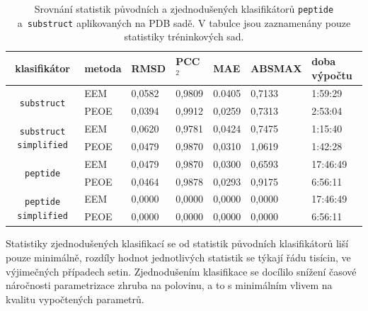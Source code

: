 \begin{table}[h]
    \renewcommand{\arraystretch}{1.4}
    \centering
    \begin{tabular}{c|l|l|l|l|l|l}
         \textbf{klasifikátor} &  \textbf{metoda} & \textbf{RMSD} & \textbf{PCC$^2$} & \textbf{MAE} & \textbf{ABSMAX} & \textbf{doba výpočtu}\\
         \hline
         \multirow{2}{6em}{\texttt{substruct}} & EEM & 0,0582 & 0,9809 & 0.0405 & 0,7133 & 1:59:29  \\
         & PEOE & 0,0394 & 0,9912 & 0,0259 & 0,7313 & 2:53:04 \\
         \hline
         \multirow{2}{6em}{\texttt{substruct simplified}} & EEM & 0,0620 & 0,9781 & 0,0424 & 0,7475 & 1:15:40 \\
         & PEOE & 0,0479 & 0,9870 & 0,0310 & 1,0619 & 1:42:28 \\
         \hline
         \multirow{2}{6em}{\texttt{peptide}} & EEM & 0,0479 & 0,9870 & 0,0300 & 0,6593 & 17:46:49 \\
         & PEOE & 0,0464 & 0,9878 & 0,0293 & 0,9175 & 6:56:11 \\
         \hline
         \multirow{2}{6em}{\texttt{peptide simplified}} & EEM & 0,0000 & 0,0000 & 0,0000 & 0,0000 & 17:46:49 \\
         & PEOE & 0,0000 & 0,0000 & 0,0000 & 0,0000 & 6:56:11
    \end{tabular}
    \caption{Srovnání statistik původních a zjednodušených klasifikátorů \texttt{peptide} a~\texttt{substruct} aplikovaných na PDB sadě. V tabulce jsou zaznamenány pouze statistiky tréninkových sad.}
    \label{statistics_simplified}
\end{table}

Statistiky zjednodušených klasifikací se od statistik původních klasifikátorů liší pou\-ze minimálně, rozdíly hodnot jednotlivých statistik se týkají řádu tisícin, ve výjimečných případech setin. Zjednodušením klasifikace se docílilo snížení časové náročnosti parametrizace zhruba na polovinu, a to s minimálním vlivem na kvalitu vypočtených parametrů.

